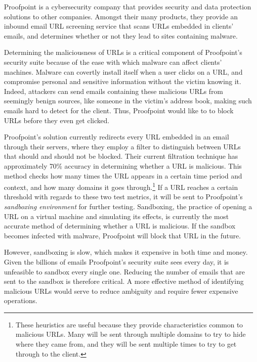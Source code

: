 \documentclass[cs,proposal]{hmcclinic}
\begin{document}
Proofpoint is a cybersecurity company that provides security and data protection solutions to other companies. Amongst their many products, they provide an inbound email URL screening service that scans URLs embedded in clients' emails, and determines whether or not they lead to sites containing malware.

Determining the maliciousness of URLs is a critical component of Proofpoint's security suite because of the ease with which malware can affect clients' machines. Malware can covertly install itself when a user clicks on a URL, and compromise personal and sensitive information without the victim knowing it. Indeed, attackers can send emails containing these malicious URLs from seemingly benign sources, like someone in the victim's address book, making such emails hard to detect for the client. Thus, Proofpoint would like to to block URLs before they even get clicked.

Proofpoint's solution currently redirects every URL embedded in an email through their servers, where they employ a filter to distinguish between URLs that should and should not be blocked. Their current filtration technique has approximately 70\% accuracy in determining whether a URL is malicious. This method checks how many times the URL appears in a certain time period and context, and how many domains it goes through.\footnote{These heuristics are useful because they provide characteristics common to malicious URLs. Many will be sent through multiple domains to try to hide where they came from, and they will be sent multiple times to try to get through to the client.} If a URL reaches a certain threshold with regards to these two test metrics, it will be sent to Proofpoint's \textit{sandboxing environment} for further testing. Sandboxing, the practice of opening a URL on a virtual machine and simulating its effects, is currently the most accurate method of determining whether a URL is malicious. If the sandbox becomes infected with malware, Proofpoint will block that URL in the future.

However, sandboxing is slow, which makes it expensive in both time and money. Given the billions of emails Proofpoint's security suite sees every day, it is unfeasible to sandbox every single one. Reducing the number of emails that are sent to the sandbox is therefore critical. A more effective method of identifying malicious URLs would serve to reduce ambiguity and require fewer expensive operations.
\end{document}

